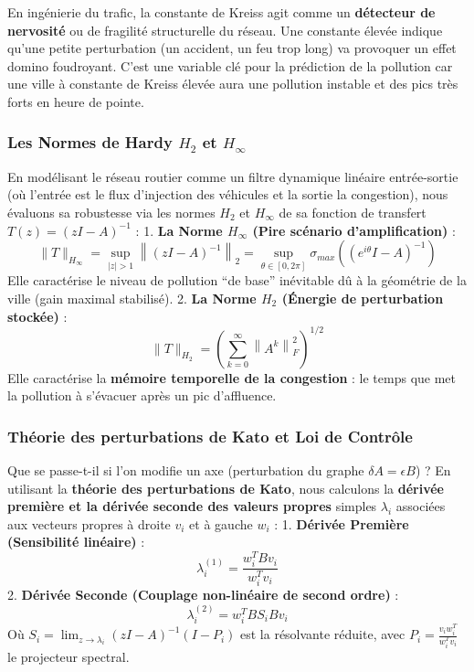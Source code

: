 \documentclass[10pt, a4paper]{article}
\begin{document}
En ingénierie du trafic, la constante de Kreiss agit comme un
\textbf{détecteur de nervosité} ou de fragilité structurelle du réseau.
Une constante élevée indique qu'une petite perturbation (un accident, un
feu trop long) va provoquer un effet domino foudroyant. C'est une
variable clé pour la prédiction de la pollution car une ville à
constante de Kreiss élevée aura une pollution instable et des pics très
forts en heure de pointe.

\subsubsection{\texorpdfstring{Les Normes de Hardy \(H_2\) et
\(H_\infty\)}{Les Normes de Hardy H\_2 et H\_\textbackslash infty}}\label{les-normes-de-hardy-h_2-et-h_infty}

En modélisant le réseau routier comme un filtre dynamique linéaire
entrée-sortie (où l'entrée est le flux d'injection des véhicules et la
sortie la congestion), nous évaluons sa robustesse via les normes
\(H_2\) et \(H_\infty\) de sa fonction de transfert
\(T(z) = (zI - A)^{-1}\) : 1. \textbf{La Norme \(H_\infty\) (Pire
scénario d'amplification)} :
\[\|T\|_{H_\infty} = \sup_{|z| > 1} \left\| (zI - A)^{-1} \right\|_2 = \sup_{\theta \in [0, 2\pi]} \sigma_{max}\left( (e^{i\theta}I - A)^{-1} \right)\]
Elle caractérise le niveau de pollution ``de base'' inévitable dû à la
géométrie de la ville (gain maximal stabilisé). 2. \textbf{La Norme
\(H_2\) (Énergie de perturbation stockée)} :
\[\|T\|_{H_2} = \left( \sum_{k=0}^{\infty} \left\| A^k \right\|_F^2 \right)^{1/2}\]
Elle caractérise la \textbf{mémoire temporelle de la congestion} : le
temps que met la pollution à s'évacuer après un pic d'affluence.

\subsubsection{Théorie des perturbations de Kato et Loi de
Contrôle}\label{thuxe9orie-des-perturbations-de-kato-et-loi-de-contruxf4le}

Que se passe-t-il si l'on modifie un axe (perturbation du graphe
\(\delta A = \epsilon B\)) ? En utilisant la \textbf{théorie des
perturbations de Kato}, nous calculons la \textbf{dérivée première et la
dérivée seconde des valeurs propres} simples \(\lambda_i\) associées aux
vecteurs propres à droite \(v_i\) et à gauche \(w_i\) : 1.
\textbf{Dérivée Première (Sensibilité linéaire)} :
\[\lambda_i^{(1)} = \frac{w_i^T B v_i}{w_i^T v_i}\] 2. \textbf{Dérivée
Seconde (Couplage non-linéaire de second ordre)} :
\[\lambda_i^{(2)} = w_i^T B S_i B v_i\] Où
\(S_i = \lim_{z \to \lambda_i} (zI - A)^{-1}(I - P_i)\) est la
résolvante réduite, avec \(P_i = \frac{v_i w_i^T}{w_i^T v_i}\) le
projecteur spectral.
\end{document}
